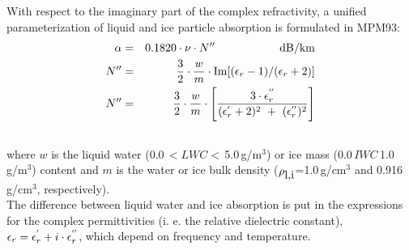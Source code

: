 With respect to the imaginary part of the complex refractivity, a 
unified parameterization of liquid and ice particle absorption 
is formulated in MPM93:
\begin{eqnarray}
  \label{eq:abs_cloud}
  \alpha & = & 0.1820 \cdot \nu \cdot\imn\hspace*{20mm}
               \mbox{dB/km}\\
    \imn & = & \frac{3}{2} \cdot \frac{w}{m} \cdot 
               \Im{[(\er-1)/(\er+2)]}\nonumber\\
    \imn & = & \frac{3}{2} \cdot \frac{w}{m} \cdot 
               \left[\frac{3\cdot\ime}{(\ree+2)^2~+~(\ime)^2}\right]\nonumber\\
  \nonumber
\end{eqnarray}
where $w$ is the liquid water (0.0\,$<LWC<$\,5.0\,g/m$^3$) or ice
mass (0.0\,$IWC$\,1.0\,g/m$^3$) content and $m$ is the water 
or ice bulk density ($\rho_{\mbox{\rm l,i}}$=1.0\,g/cm$^3$ and 0.916\,g/cm$^3$, respectively).\\
The difference between liquid water and ice absorption is put in the 
expressions for the complex permittivities (i. e. the relative 
dielectric constant), $\epsilon_r=\epsilon^{'}_r+i\cdot\epsilon^{''}_r$, which depend on frequency
and temperature.

